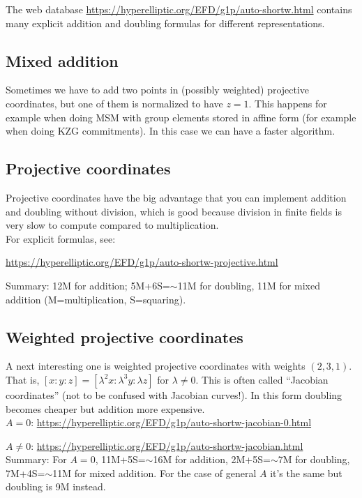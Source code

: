 \documentclass[12pt,draft,a4paper,openany,oneside]{amsbook}
\theoremstyle{plain}
\theoremstyle{definition}
\begin{document}
The web database \url{https://hyperelliptic.org/EFD/g1p/auto-shortw.html} 
contains many explicit addition and doubling formulas for different representations.

\subsection{Mixed addition}
Sometimes we have to add two points in (possibly weighted) projective coordinates,
but one of them is normalized to have $z=1$. This happens for example when doing MSM 
with group elements stored in affine form (for example when doing KZG commitments).
In this case we can have a faster algorithm.

\subsection{Projective coordinates} 
Projective coordinates have the big advantage
that you can implement addition and doubling without division, which is good
because division in finite fields is very slow to compute compared to multiplication.\\

For explicit formulas, see:

\noindent
\url{https://hyperelliptic.org/EFD/g1p/auto-shortw-projective.html}

\noindent
Summary: 12M for addition; 5M+6S=$\sim$11M for doubling,
11M for mixed addition (M=multiplication, S=squaring).

\subsection{Weighted projective coordinates} 
A next interesting one is weighted projective
coordinates with weights $(2,3,1)$. That is, $[x:y:z] = [\lambda^2x:\lambda^3y:\lambda z]$
for $\lambda\neq0$. This is often called ``Jacobian coordinates'' (not to be confused
with Jacobian curves!). In this form doubling becomes cheaper but addition more expensive.\\

\noindent 
$A=0$:    \url{https://hyperelliptic.org/EFD/g1p/auto-shortw-jacobian-0.html}

\noindent
$A\neq0$: \url{https://hyperelliptic.org/EFD/g1p/auto-shortw-jacobian.html} \\

Summary: For $A=0$, 11M+5S=$\sim$16M for addition, 2M+5S=$\sim$7M for doubling,
7M+4S=$\sim$11M for mixed addition.
For the case of general $A$ it's the same but doubling is 9M instead.
\end{document}
